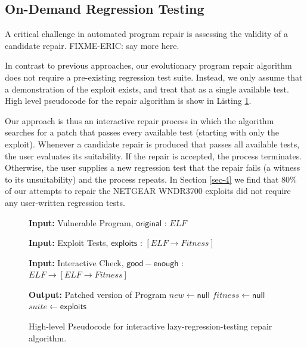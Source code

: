 \documentclass{sigcomm-alternate}
\begin{document}
\subsection{On-Demand Regression Testing}
\label{sec-3-3}

A critical challenge in automated program repair is assessing the validity
of a candidate repair. FIXME-ERIC: say more here. 

In contrast to previous approaches, 
our evolutionary program repair algorithm does
not require a pre-existing regression test suite.  Instead, we  
only assume that a demonstration of the exploit exists, and treat that as a
single available test. 
High level pseudocode for the repair algorithm is show in Listing
\ref{lazy-algorithm}.

Our approach is thus an interactive repair process in which the
algorithm searches for a patch that 
passes every available test (starting with only the exploit). 
Whenever a candidate repair is produced that passes all available tests,
the user evaluates its suitability. If the repair is accepted, the process
terminates. Otherwise, the user supplies a new regression test that the repair
fails (a witness to its unsuitability) and the process repeats. 
In Section \ref{sec-4} we find that 80\% of our
attempts to repair the NETGEAR WNDR3700 exploits did not require any
user-written regression tests.

\begin{figure}[H]
\begin{algorithmic}[1]
\small
\item[{\textbf{Input: }} {Vulnerable Program, $\mathsf{original}$ : $ELF$}]
\item[{\textbf{Input: }} {Exploit Tests, $\mathsf{exploits}$ : $[ELF \rightarrow Fitness]$}]
\item[{\textbf{Input: }} {Interactive Check, $\mathsf{good-enough}$ : $ELF \rightarrow [ELF \rightarrow Fitness]$}]
\item[{\textbf{Output: }} {Patched version of Program}] 
   $new \leftarrow \mathsf{null}$ 
   $fitness \leftarrow \mathsf{null}$ 
   $suite \leftarrow \mathsf{exploits}$ 
\end{algorithmic}
\caption{\label{lazy-algorithm}High-level Pseudocode for interactive
lazy-regression-testing repair algorithm.}
\end{figure}
\end{document}
